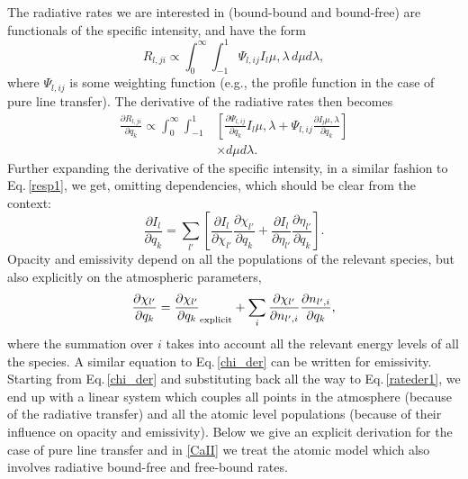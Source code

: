 \documentclass[referee]{aa}
\begin{document}
The radiative rates we are interested in (bound-bound and bound-free) are functionals of the specific intensity, and have the  form
\begin{equation}
 R_{l,ji} \propto \int_0^{\infty} \int_{-1}^{1} \Psi_{l,ij} I_l{\mu,\lambda}\,d\mu d\lambda,
\end{equation}
where $\Psi_{l,ij}$ is some weighting function (e.g., the profile function in the case of pure line transfer). The derivative of the radiative rates then becomes 
\begin{align}
 \frac{\partial R_{l,ji}}{\partial q_k} \propto \int_0^{\infty} \int_{-1}^{1} & \left [ \frac{\partial\Psi_{l,ij}}{\partial q_k} I_l{\mu,\lambda} + \Psi_{l,ij} \frac{\partial I_l{\mu,\lambda}}{\partial q_k} \right ] \nonumber \\
 & \times d\mu d\lambda.
\end{align}
Further expanding the derivative of the specific intensity, in a similar fashion to Eq.\,\ref{resp1}, we get, omitting dependencies, which should be clear from the context:
\begin{equation}
 \frac{\partial I_l}{\partial q_k} = \sum_{l'} \left[ \frac{\partial I_l}{\partial \chi_{l'}} \frac{\partial\chi_{l'}}{\partial q_k} + \frac{\partial I_l}{\partial \eta_{l'}} \frac{\partial\eta_{l'}}{\partial q_k} \right ].
\end{equation}
Opacity and emissivity depend on all the populations of the relevant species, but also explicitly on the atmospheric parameters,
\begin{equation}
\frac{\partial\chi_{l'}}{\partial q_k} = \frac{\partial\chi_{l'}}{\partial q_k}_{\rm{explicit}} + \sum_i \frac{\partial\chi_{l'}}{\partial n_{l',i}} \frac{\partial n_{l',i}}{\partial q_k},
\label{chi_der}
\end{equation}
where the summation over $i$ takes into account all the relevant energy levels of all the species. A similar equation to Eq.\,\ref{chi_der} can be written for emissivity. Starting from Eq.\,\ref{chi_der} and substituting back all the way to  Eq.\,\ref{rateder1}, we end up with a linear system which couples all points in the atmosphere (because of the radiative transfer) and all the atomic level populations (because of their influence on opacity and emissivity). Below we give an explicit derivation for the case of pure line transfer and in \ref{CaII} we treat the atomic model which also involves radiative bound-free and free-bound rates.
\end{document}
